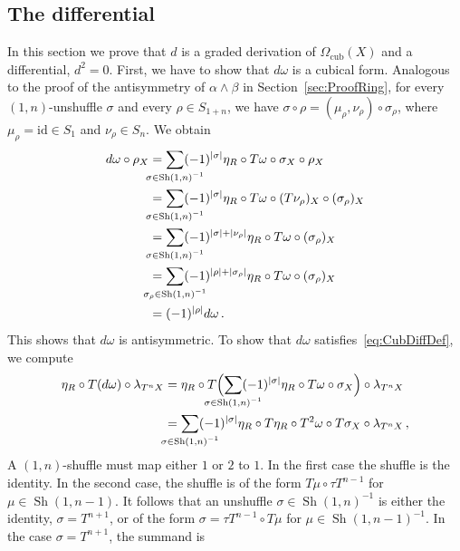 \documentclass[12pt,reqno, a4paper]{amsart}
\numberwithin{equation}{section}
\theoremstyle{plain}
\theoremstyle{definition}
\theoremstyle{remark}
\DeclareMathOperator{\Shuff}{Sh}
\newcommand{\id}{\mathrm{id}}
\newcommand{\Val}{\eta}
\begin{document}
\subsection{The differential}

In this section we prove that $d$ is a graded derivation of $\Omega_\mathrm{cub}(X)$ and a differential, $d^2 = 0$. First, we have to show that $d\omega$ is a cubical form. Analogous to the proof of the antisymmetry of $\alpha \wedge \beta$ in Section~\ref{sec:ProofRing}, for every $(1,n)$-unshuffle $\sigma$ and every $\rho \in S_{1+n}$, we have $\sigma \circ \rho = (\mu_\rho,\nu_\rho) \circ \sigma_\rho$, where $\mu_\rho = \id \in S_1$ and $\nu_\rho \in S_n$. We obtain
\begin{equation*}
\begin{split}
  d\omega \circ \rho_X
  &=
  \sum_{\mathclap{\sigma \in \Shuff(1,n)^{-1} }}
  (-1)^{|\sigma|}\Val_R \circ T\omega \circ \sigma_X \circ \rho_X
  \\
  &=
  \sum_{\mathclap{\sigma \in \Shuff(1,n)^{-1} }}
  (-1)^{|\sigma|}\Val_R \circ T\omega \circ (T\nu_\rho)_X
  \circ (\sigma_\rho)_X
  \\
  &=
  \sum_{\mathclap{\sigma \in \Shuff(1,n)^{-1} }}
  (-1)^{|\sigma| + |\nu_\rho|}\Val_R \circ T\omega
  \circ (\sigma_\rho)_X
  \\
  &=
  \sum_{\mathclap{\sigma_\rho \in \Shuff(1,n)^{-1} }}
  (-1)^{|\rho| + |\sigma_\rho|}\Val_R \circ T\omega
  \circ (\sigma_\rho)_X
  \\
  &=
  (-1)^{|\rho|} d\omega
  \,.
\end{split}
\end{equation*}
This shows that $d\omega$ is antisymmetric. To show that $d\omega$ satisfies~\eqref{eq:CubDiffDef}, we compute
\begin{equation}
\label{eq:domegaDiff1}
\begin{split}
  \Val_R \circ T(d\omega) \circ \lambda_{T^n X}
  &=
  \Val_R \circ T\Bigl( 
  \sum_{\mathclap{\sigma \in \Shuff(1,n)^{-1} }}
  (-1)^{|\sigma|} \Val_R \circ T\omega \circ \sigma_X
  \Bigr) \circ \lambda_{T^n X}
  \\
  &=
  \sum_{\mathclap{\sigma \in \Shuff(1,n)^{-1} }}
  (-1)^{|\sigma|} 
  \Val_R \circ T\Val_R \circ T^2 \omega \circ T\sigma_X
  \circ \lambda_{T^n X}
  \,,
\end{split}
\end{equation}
A $(1,n)$-shuffle must map either $1$ or $2$ to $1$. In the first case the shuffle is the identity. In the second case, the shuffle is of the form $T\mu \circ \tau T^{n-1}$ for $\mu \in \Shuff(1,n-1)$. It follows that an unshuffle $\sigma \in \Shuff(1,n)^{-1}$ is either the identity, $\sigma = T^{n+1}$, or of the form $\sigma = \tau T^{n-1} \circ T\mu$ for $\mu \in \Shuff(1,n-1)^{-1}$. In the case $\sigma = T^{n+1}$, the summand is
\end{document}

